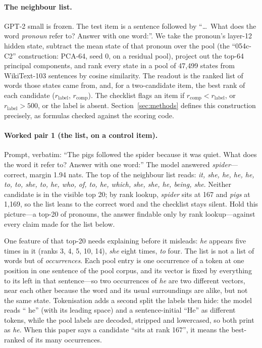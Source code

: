 \documentclass[11pt]{article}
\begin{document}
\paragraph{The neighbour list.} GPT-2 small is frozen. The test item is
a sentence followed by ``\ldots\ What does the word \emph{pronoun}
refer to? Answer with one word:''. We take the pronoun's layer-12
hidden state, subtract the mean state of that pronoun over the pool
(the ``054c-C2'' construction: PCA-64, seed 0, on a residual pool),
project out the top-64 principal components, and rank every state in a
pool of 47,499 states from WikiText-103 sentences by cosine similarity.
The readout is the ranked list of words those states came from, and,
for a two-candidate item, the best rank of each candidate
($r_{\text{label}}$, $r_{\text{comp}}$). The checklist flags an item if $r_{\text{comp}} < r_{\text{label}}$, or $r_{\text{label}} > 500$, or the label is absent. Section~\ref{sec:methods} defines this construction precisely, as formulas checked against the scoring code.

\paragraph{Worked pair 1 (the list, on a control item).}
Prompt, verbatim: ``The pigs followed the spider because it was quiet.
What does the word it refer to? Answer with one word:'' The model
answered \emph{spider}---correct, margin 1.94 nats. The top of the
neighbour list reads: \emph{it, she, he, he, he, to, to, she, to, he,
who, of, to, he, which, she, she, he, being, she}. Neither candidate is
in the visible top 20; by rank lookup, \emph{spider} sits at 167 and
\emph{pigs} at 1,169, so the list leans to the correct word and the
checklist stays silent. Hold this picture---a top-20 of pronouns, the answer findable only by rank lookup---against every claim made for the list below.

One feature of that top-20 needs explaining before it misleads:
\emph{he} appears five times in it (ranks 3, 4, 5, 10, 14), \emph{she}
eight times, \emph{to} four. The list is not a list of words but of
\emph{occurrences}. Each pool entry is one occurrence of a token at
one position in one sentence of the pool corpus, and its vector is
fixed by everything to its left in that sentence---so two
occurrences of \emph{he} are two different vectors, near each other
because the word and its usual surroundings are alike, but not the
same state. Tokenisation adds a second split the labels then hide:
the model reads `` he'' (with its leading space) and a
sentence-initial ``He'' as different tokens, while the pool labels
are decoded, stripped and lowercased, so both print as \emph{he}.
When this paper says a candidate ``sits at rank 167'', it means the
best-ranked of its many occurrences.
\end{document}
